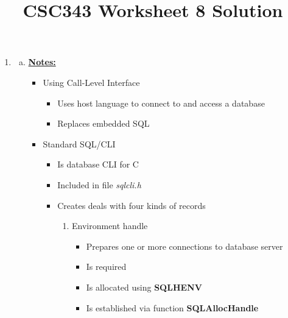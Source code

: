 \documentclass[12pt]{article}
\begin{document}
\title{CSC343 Worksheet 8 Solution}
\maketitle

\bigskip

\begin{enumerate}[1.]
    \item

    \bigskip

    \begin{enumerate}[a)]
        \item

        \bigskip

        \underline{\textbf{Notes:}}

        \begin{itemize}
            \item Using Call-Level Interface
            \begin{itemize}
                \item Uses host language to connect to and access a database
                \item Replaces embedded SQL
            \end{itemize}
            \item Standard SQL/CLI
            \begin{itemize}
                \item Is database CLI for C
                \item Included in file \textit{sqlcli.h}
                \item Creates deals with four kinds of records

                \bigskip

                \begin{enumerate}[1.]
                    \item Environment handle
                    \begin{itemize}
                        \item Prepares one or more connections to database server
                        \item Is required
                        \item Is allocated using \textbf{SQLHENV}
                        \item Is established via function \textbf{SQLAllocHandle}


\end{itemize}
\end{enumerate}
\end{itemize}
\end{itemize}
\end{enumerate}
\end{enumerate}
\end{document}
